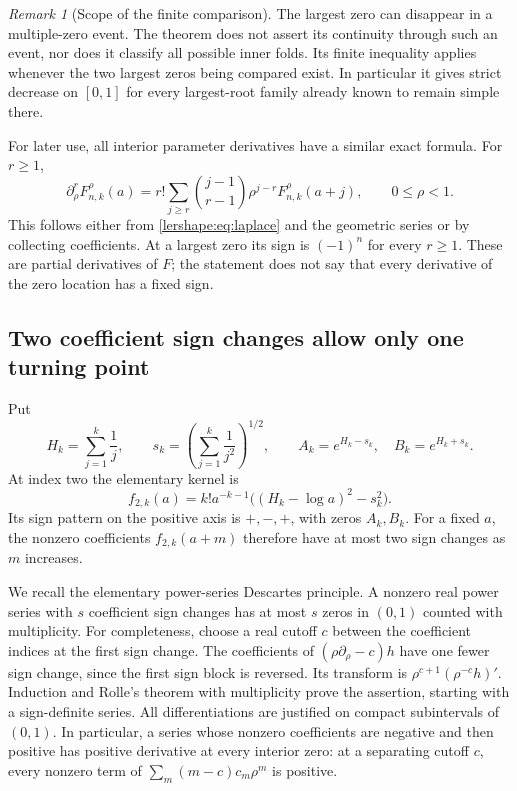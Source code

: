 \documentclass[11pt,a4paper]{article}
\numberwithin{equation}{section}
\theoremstyle{definition}
\theoremstyle{remark}
\newtheorem{remark}[theorem]{Remark}
\begin{document}
\begin{remark}[Scope of the finite comparison]
The largest zero can disappear in a multiple-zero event. The theorem
does not assert its continuity through such an event, nor does it
classify all possible inner folds. Its finite inequality applies
whenever the two largest zeros being compared exist. In particular it
gives strict decrease on $[0,1]$ for every largest-root family already
known to remain simple there.
\end{remark}

For later use, all interior parameter derivatives have a similar exact
formula. For $r\geq1$,
\begin{equation}\label{lershape:eq:higher-parameter}
 \partial_\rho^rF_{n,k}^{\rho}(a)
 =r!\sum_{j\geq r}\binom{j-1}{r-1}\rho^{j-r}
 F_{n,k}^{\rho}(a+j),\qquad 0\leq\rho<1.
\end{equation}
This follows either from \eqref{lershape:eq:laplace} and the geometric
series or by collecting coefficients. At a largest zero its sign is
$(-1)^n$ for every $r\geq1$. These are partial derivatives of $F$;
the statement does not say that every derivative of the zero location
has a fixed sign.

\subsection{Two coefficient sign changes allow only one turning point}

Put
\begin{equation}\label{lershape:eq:two-roots}
 H_k=\sum_{j=1}^k\frac1j,\qquad
 s_k=\left(\sum_{j=1}^k\frac1{j^2}\right)^{1/2},\qquad
 A_k=e^{H_k-s_k},\quad B_k=e^{H_k+s_k}.
\end{equation}
At index two the elementary kernel is
\begin{equation}\label{lershape:eq:f2}
 f_{2,k}(a)=k!a^{-k-1}\bigl((H_k-\log a)^2-s_k^2\bigr).
\end{equation}
Its sign pattern on the positive axis is $+,-,+$, with zeros $A_k,B_k$.
For a fixed $a$, the nonzero coefficients $f_{2,k}(a+m)$ therefore
have at most two sign changes as $m$ increases.

We recall the elementary power-series Descartes principle. A nonzero
real power series with $s$ coefficient sign changes has at most $s$
zeros in $(0,1)$ counted with multiplicity. For completeness, choose a
real cutoff $c$ between the coefficient indices at the first sign
change. The coefficients of $(\rho\partial_\rho-c)h$ have one fewer
sign change, since the first sign block is reversed. Its transform is
$\rho^{c+1}(\rho^{-c}h)'$. Induction and Rolle's theorem with
multiplicity prove the assertion, starting with a sign-definite series.
All differentiations are justified on compact subintervals of $(0,1)$.
In particular, a series whose nonzero coefficients are negative and
then positive has positive derivative at every interior zero: at a
separating cutoff $c$, every nonzero term of
$\sum_m(m-c)c_m\rho^m$ is positive.
\end{document}
